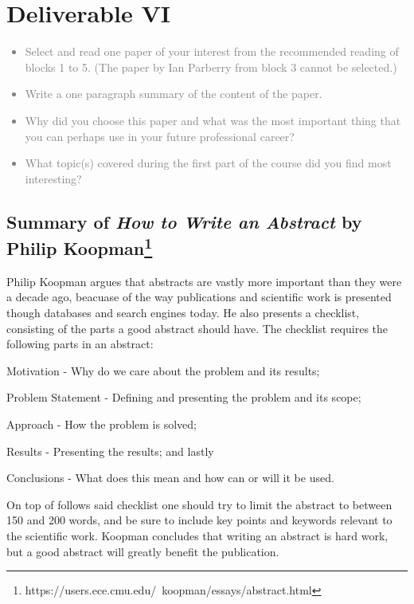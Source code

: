 \chapter{Deliverable VI}
\textcolor{gray}{%
\begin{itemize}
    \item Select and read one paper of your interest from the recommended reading of blocks 1 to 5. (The paper by Ian Parberry from block 3 cannot be selected.)
    \item Write a one paragraph summary of the content of the paper.
    \item Why did you choose this paper and what was the most important thing that you can perhaps use in your future professional career?
    \item What topic(s) covered during the first part of the course did you find most interesting?
\end{itemize}}

\section{Summary of \textit{How to Write an Abstract} by Philip Koopman\footnote{https://users.ece.cmu.edu/~koopman/essays/abstract.html}}
Philip Koopman argues that abstracts are vastly more important than they were a decade ago, beacuase of the way publications and scientific work is presented though databases and search engines today.
He also presents a checklist, consisting of the parts a good abstract should have.
The checklist requires the following parts in an abstract:
\begin{enumerate*}
    \item Motivation - Why do we care about the problem and its results;
    \item Problem Statement - Defining and presenting the problem and its scope;
    \item Approach - How the problem is solved;
    \item Results - Presenting the results; and lastly
    \item Conclusions - What does this mean and how can or will it be used.
\end{enumerate*}
On top of follows said checklist one should try to limit the abstract to between 150 and 200 words, and be sure to include key points and keywords relevant to the scientific work.
Koopman concludes that writing an abstract is hard work, but a good abstract will greatly benefit the publication.

